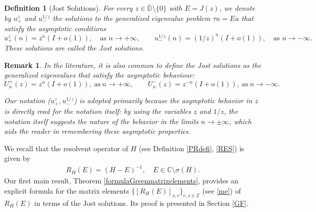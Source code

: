 \documentclass[12pt,oneside,onecolumn,open]{article}
\newtheorem{defi}[teo]{Definition}
\newtheorem{obs}[teo]{Remark}
\begin{document}
\begin{defi}[Jost Solutions]


\label{jost}  For every \( z \in \overline{\mathbb{D}} \setminus \{0\} \) with \( E = J(z) \), we denote by \( u_+^z \) and \( u_-^{1/z} \) the solutions to the generalized eigenvalue problem \( \tau u = E u \) that satisfy the asymptotic conditions
\begin{equation}
\label{eq:as}
    u_{+}^z(n)= z^{n}(I + o(1)), \quad \text{as } n \to +\infty, \qquad
    u_-^{1/z}(n) = (1/z)^n(I + o(1)), \quad \text{as } n \to -\infty.
\end{equation}
These solutions are called the Jost solutions.
\end{defi}
\begin{obs}
    In the literature, it is also common to define the Jost solutions as the generalized eigenvalues that satisfy the asymptotic behaviour:
    \begin{equation}
\label{eq:as}
  U_{n}^{+}(z)=z^n(I+o(1)), \ \text{as} \ n \to + \infty,
    \qquad
   U_n^{-}(z)= z^{-n} (I+o(1)), \ \text{as} \ n \to -\infty.
\end{equation}
    
    Our notation ($u_+^z, u_-^{1/z}$) is adopted primarily because the asymptotic behavior in $z$ is directly read for the notation itself: by using the variables $z$ and $1/z$, the notation itself suggests the nature of the behavior in the limits $n \to \pm \infty$, which aids the reader in remembering these asymptotic properties.
\end{obs}
\color{black}

We recall that the resolvent operator of \(H\) (see Definition \ref{PRdefi}, \eqref{RES}) is given by
\begin{align}
    R_{H}(E) = (H - E)^{-1}, \quad E \in \mathbb{C} \setminus \sigma(H).
\end{align}
Our first main result, Theorem \ref{formulaGreenmatrixelements}, provides an explicit formula for the matrix elements \(\{[R_{H}(E)]_{s,r}\}_{r,s\in \mathbb{Z}}\) (see \eqref{me}) of \(R_{H}(E)\) in terms of the Jost solutions. Its proof is presented in Section \ref{GF}.
\end{document}
